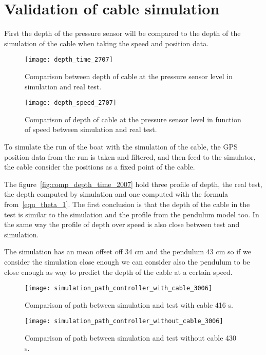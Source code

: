 \section{Validation of cable simulation}

First the depth of the pressure sensor will be compared to the depth of the simulation of the cable when taking the speed and position data.

\begin{figure}[H]
\centering
    \begin{minipage}[b]{0.4\textwidth}
    \centering
    \texttt{[image: depth\_time\_2707]}
    \caption{Comparison between depth of cable at the pressure sensor level in simulation and real test.}
    \label{fig:comp_depth_time_2007}
    \end{minipage}
    \hfill
    \begin{minipage}[b]{0.45\textwidth}
    \centering
    \texttt{[image: depth\_speed\_2707]}
    \caption{Comparison of depth of cable at the pressure sensor level in function of speed between simulation and real test.}
    \label{fig:comp_depth_speed_2007}
    \end{minipage}
\end{figure}

To simulate the run of the boat with the simulation of the cable, the \gls{GPS} position data from the run is taken and filtered, and then feed to the simulator, the cable consider the positions as a fixed point of the cable.

The figure~\ref{fig:comp_depth_time_2007} hold three profile of depth, the real test, the depth computed by simulation and one computed with the formula from~\ref{equ_theta_1}. The first conclusion is that the depth of the cable in the test is similar to the simulation and the profile from the pendulum model too.
 In the same way the profile of depth over speed is also close between test and simulation.
 
 The simulation has an mean offset off 34 cm and the pendulum 43 cm so if we consider the simulation close enough we can consider also the pendulum to be close enough as way to predict the depth of the cable at a certain speed.
 
 \begin{figure}[H]
\centering
    \begin{minipage}[b]{0.4\textwidth}
    \centering
    \texttt{[image: simulation\_path\_controller\_with\_cable\_3006]}
    \caption{Comparison of path between simulation and test with cable 416 s.}
    \label{fig:comp_w_cable_3006}
    \end{minipage}
    \hfill
    \begin{minipage}[b]{0.45\textwidth}
    \centering
    \texttt{[image: simulation\_path\_controller\_without\_cable\_3006]}
    \caption{Comparison of path between simulation and test without cable 430 s.}
    \label{fig:comp_wt_cable_3006}
    \end{minipage}
\end{figure}

